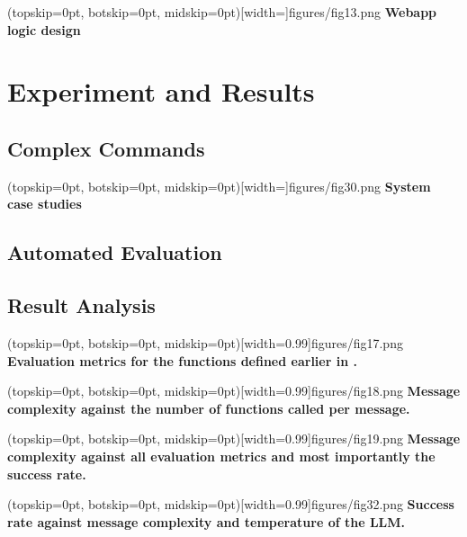 \documentclass{ieeeaccess}
\begin{document}
\Figure[t!](topskip=0pt, botskip=0pt,
midskip=0pt)[width=\textwidth]{{figures/fig13.png}}
{ \textbf{Webapp logic design}\label{fig5}}

\section{Experiment and Results}
\label{sec:guidelines}

\subsection{Complex Commands}
\Figure[t!](topskip=0pt, botskip=0pt,
midskip=0pt)[width=\textwidth]{{figures/fig30.png}}
{ \textbf{System case studies}\label{fig6}}


\subsection{Automated Evaluation}
\subsection{Result Analysis}
\Figure[t!](topskip=0pt, botskip=0pt,
midskip=0pt)[width=0.99\columnwidth]{{figures/fig17.png}}
{ \textbf{Evaluation metrics for the functions defined earlier in .}\label{fig7}}

\Figure[t!](topskip=0pt, botskip=0pt,
midskip=0pt)[width=0.99\columnwidth]{{figures/fig18.png}}
{ \textbf{Message complexity against the number of functions called per message.}\label{fig8}}

\Figure[t!](topskip=0pt, botskip=0pt,
midskip=0pt)[width=0.99\columnwidth]{{figures/fig19.png}}
{ \textbf{Message complexity against all evaluation metrics and most importantly the success rate.}\label{fig9}}



\Figure[t!](topskip=0pt, botskip=0pt,
midskip=0pt)[width=0.99\columnwidth]{{figures/fig32.png}}
{ \textbf{Success rate against message complexity and temperature of the LLM.}\label{fig10}}
\end{document}

